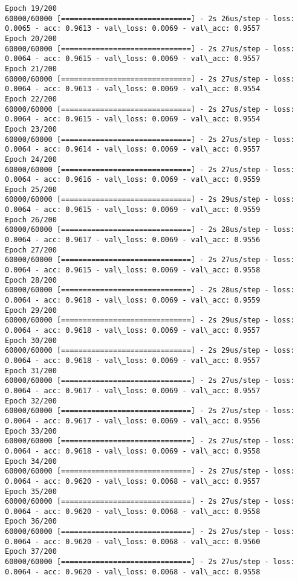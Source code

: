 \documentclass[11pt]{article}
\begin{document}
\begin{Verbatim}[commandchars=\\\{\}]
Epoch 19/200
60000/60000 [==============================] - 2s 26us/step - loss: 0.0065 - acc: 0.9613 - val\_loss: 0.0069 - val\_acc: 0.9557
Epoch 20/200
60000/60000 [==============================] - 2s 27us/step - loss: 0.0064 - acc: 0.9615 - val\_loss: 0.0069 - val\_acc: 0.9557
Epoch 21/200
60000/60000 [==============================] - 2s 27us/step - loss: 0.0064 - acc: 0.9613 - val\_loss: 0.0069 - val\_acc: 0.9554
Epoch 22/200
60000/60000 [==============================] - 2s 27us/step - loss: 0.0064 - acc: 0.9615 - val\_loss: 0.0069 - val\_acc: 0.9554
Epoch 23/200
60000/60000 [==============================] - 2s 27us/step - loss: 0.0064 - acc: 0.9614 - val\_loss: 0.0069 - val\_acc: 0.9557
Epoch 24/200
60000/60000 [==============================] - 2s 27us/step - loss: 0.0064 - acc: 0.9616 - val\_loss: 0.0069 - val\_acc: 0.9559
Epoch 25/200
60000/60000 [==============================] - 2s 29us/step - loss: 0.0064 - acc: 0.9615 - val\_loss: 0.0069 - val\_acc: 0.9559
Epoch 26/200
60000/60000 [==============================] - 2s 28us/step - loss: 0.0064 - acc: 0.9617 - val\_loss: 0.0069 - val\_acc: 0.9556
Epoch 27/200
60000/60000 [==============================] - 2s 27us/step - loss: 0.0064 - acc: 0.9615 - val\_loss: 0.0069 - val\_acc: 0.9558
Epoch 28/200
60000/60000 [==============================] - 2s 28us/step - loss: 0.0064 - acc: 0.9618 - val\_loss: 0.0069 - val\_acc: 0.9559
Epoch 29/200
60000/60000 [==============================] - 2s 29us/step - loss: 0.0064 - acc: 0.9618 - val\_loss: 0.0069 - val\_acc: 0.9557
Epoch 30/200
60000/60000 [==============================] - 2s 29us/step - loss: 0.0064 - acc: 0.9618 - val\_loss: 0.0069 - val\_acc: 0.9557
Epoch 31/200
60000/60000 [==============================] - 2s 27us/step - loss: 0.0064 - acc: 0.9617 - val\_loss: 0.0069 - val\_acc: 0.9557
Epoch 32/200
60000/60000 [==============================] - 2s 27us/step - loss: 0.0064 - acc: 0.9617 - val\_loss: 0.0069 - val\_acc: 0.9556
Epoch 33/200
60000/60000 [==============================] - 2s 27us/step - loss: 0.0064 - acc: 0.9618 - val\_loss: 0.0069 - val\_acc: 0.9558
Epoch 34/200
60000/60000 [==============================] - 2s 27us/step - loss: 0.0064 - acc: 0.9620 - val\_loss: 0.0068 - val\_acc: 0.9557
Epoch 35/200
60000/60000 [==============================] - 2s 27us/step - loss: 0.0064 - acc: 0.9620 - val\_loss: 0.0068 - val\_acc: 0.9558
Epoch 36/200
60000/60000 [==============================] - 2s 27us/step - loss: 0.0064 - acc: 0.9620 - val\_loss: 0.0068 - val\_acc: 0.9560
Epoch 37/200
60000/60000 [==============================] - 2s 27us/step - loss: 0.0064 - acc: 0.9620 - val\_loss: 0.0068 - val\_acc: 0.9558

\end{Verbatim}
\end{document}
